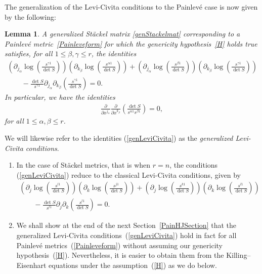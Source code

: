 \documentclass[pdftex]{sigma}
\numberwithin{equation}{section}
\newtheorem{Lemma}[Theorem]{Lemma}
\newcommand{\jalpha}{j_{\alpha}}
\newcommand{\kbeta}{k_{\beta}}
\begin{document}
The generalization of the Levi-Civita conditions to the Painlev\'e case is now given by the following:
\begin{Lemma} \label{LeviCivita}
A generalized St\"ackel matrix \eqref{genStackelmat} corresponding to a Painlev\'e metric~\eqref{Painleveform} for which the genericity hypothesis~\eqref{H} holds true satisfies, for all $1\leq \beta, \gamma \leq r$,
the identities
\begin{gather}
\left(\partial_{\jalpha}\log\left(\frac{s^{\gamma 1}}{\det S}\right)\right) \left(\partial_{\kbeta}\log\left(\frac{s^{\alpha 1}}{\det S}\right)\right)+\left(\partial_{\jalpha}\log\left(\frac{s^{\beta 1}}{\det S}\right)\right)\left(\partial_{\kbeta}\log\left(\frac{s^{\gamma 1}}{\det S}\right)\right)\nonumber\\
\qquad{} -\frac{\det S}{s^{\gamma 1}}\partial_{\jalpha}\partial_{\kbeta}\left(\frac{s^{\gamma 1}}{\det S}\right)=0.\label{genLeviCivita}
\end{gather}
In particular, we have the identities
\begin{gather}\label{secondorder}
\frac{\partial}{\partial x^{\jalpha}}\frac{\partial }{\partial x^{\kbeta}}\left(\frac{\det S}{s^{\alpha1}s^{\beta1}}\right)=0,
\end{gather}
for all
$1\leq \alpha, \beta \leq r$.
\end{Lemma}
We will likewise refer to the identities (\ref{genLeviCivita}) as the {\emph{generalized Levi-Civita conditions}}.
\begin{Remark}\quad
\begin{enumerate}\itemsep=0pt
\item[1)] In the case of St\"ackel metrics, that is when $r=n$, the conditions (\ref{genLeviCivita}) reduce to the classical Levi-Civita conditions, given by
\begin{gather*}
\left(\partial_{j}\log\left(\frac{s^{l1}}{\det S}\right)\right)\left(\partial_{k}\log\left(\frac{s^{j1}}{\det S}\right)\right)+\left(\partial_{j}\log\left(\frac{s^{k1}}{\det S}\right)\right)\left(\partial_{k}\log \left(\frac{s^{l1}}{\det S}\right)\right)\\
\qquad{} -\frac{\det S}{s^{l1}}\partial_{j}\partial_{k}\left(\frac{s^{l1}}{\det S}\right)=0.
\end{gather*}
\item[2)] We shall show at the end of the next Section~\ref{PainHJSection} that the generalized Levi-Civita condi\-tions~(\ref{genLeviCivita}) hold in fact for all Painlev\'e metrics~(\ref{Painleveform}) without assuming our genericity hypothesis~(\ref{H}). Nevertheless, it is easier to obtain them from the Killing--Eisenhart equations under the assumption~(\ref{H}) as we do below.
\end{enumerate}
\end{Remark}
\end{document}
